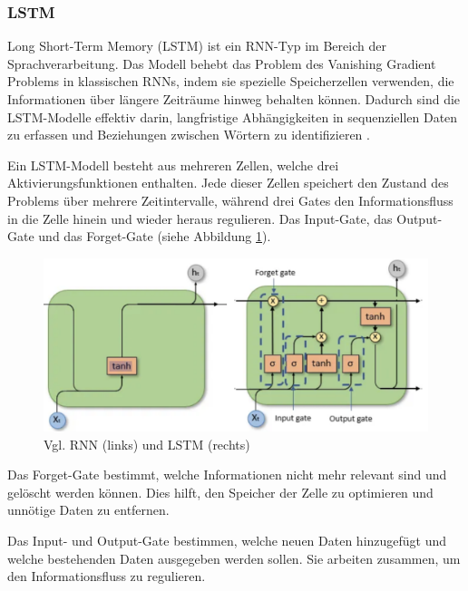 \subsubsection{LSTM}

Long Short-Term Memory (LSTM) ist ein RNN-Typ im Bereich der Sprachverarbeitung. Das Modell behebt das Problem des 
Vanishing Gradient Problems in klassischen RNNs, indem sie spezielle Speicherzellen verwenden, die Informationen über 
längere Zeiträume hinweg behalten können.
Dadurch sind die LSTM-Modelle effektiv darin, langfristige Abhängigkeiten in sequenziellen Daten zu erfassen und
Beziehungen zwischen Wörtern zu identifizieren \cite{Deshai:2023aa}.

Ein LSTM-Modell besteht aus mehreren Zellen, welche drei Aktivierungsfunktionen enthalten.
Jede dieser Zellen speichert den Zustand des Problems über mehrere Zeitintervalle, während drei Gates den 
Informationsfluss in die Zelle hinein und wieder heraus regulieren.
Das Input-Gate, das Output-Gate und das Forget-Gate \cite{berrajaa2022nlp} (siehe Abbildung \ref{fig:rnnvslstm}).

\begin{figure}[htbp]
    \begin{center}
    \includegraphics[scale=0.4]{static/RNNvsLSTM.png}
    \caption{\label{fig:rnnvslstm} Vgl. RNN (links) und LSTM (rechts) \cite{aiml2025sequence}}
    \end{center}
\end{figure}

Das Forget-Gate bestimmt, welche Informationen nicht mehr relevant sind und gelöscht werden können. 
Dies hilft, den Speicher der Zelle zu optimieren und unnötige Daten zu entfernen.

Das Input- und Output-Gate bestimmen, welche neuen Daten hinzugefügt und welche bestehenden 
Daten ausgegeben werden sollen. Sie arbeiten zusammen, um den Informationsfluss zu regulieren.

